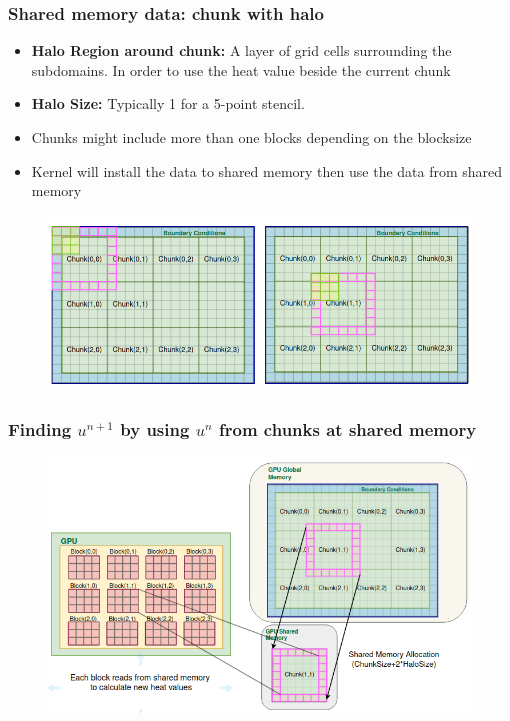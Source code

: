 \documentclass[9pt]{beamer}
\begin{document}
\begin{frame}
\frametitle{Shared memory data: chunk with halo}
\begin{itemize}
    \item \textbf{Halo Region around chunk:} A layer of grid cells surrounding the subdomains. In order to use the heat value beside the current chunk
    \item \textbf{Halo Size:} Typically 1 for a 5-point stencil.
    \item Chunks might include more than one blocks depending on the blocksize
    \item Kernel will install the data to shared memory then use the data from shared memory
\end{itemize}

\begin{figure}
    \centering
    \includegraphics[width=0.8\linewidth]{Screenshot from 2024-08-30 19-03-50.png}
    \label{fig:enter-label}
\end{figure}
\end{frame}

\begin{frame}
\frametitle{Finding $u^{n+1}$ by using $u^{n}$ from chunks at shared memory}
\begin{figure}
    \centering
    \includegraphics[width=0.9\linewidth]{Screenshot from 2024-10-01 13-19-49.png}
    \label{fig:enter-label}
\end{figure}
\end{frame}
\end{document}
